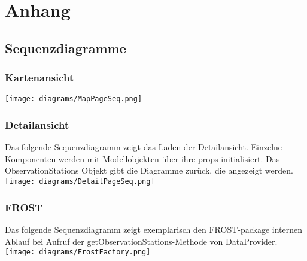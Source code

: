 \section{Anhang}
\subsection{Sequenzdiagramme}
\subsubsection*{Kartenansicht}


\texttt{[image: diagrams/MapPageSeq.png]}

\newpage
\subsubsection*{Detailansicht}
Das folgende Sequenzdiagramm zeigt das Laden der \gls{Detailansicht}. Einzelne Komponenten werden mit Modellobjekten über ihre props initialisiert. Das ObservationStations Objekt gibt die Diagramme zurück, die angezeigt werden.\\


\texttt{[image: diagrams/DetailPageSeq.png]}

\newpage
\subsubsection*{FROST}
Das folgende Sequenzdiagramm zeigt exemplarisch den FROST-package internen Ablauf bei Aufruf der getObservationStations-Methode von DataProvider.\\


\texttt{[image: diagrams/FrostFactory.png]}